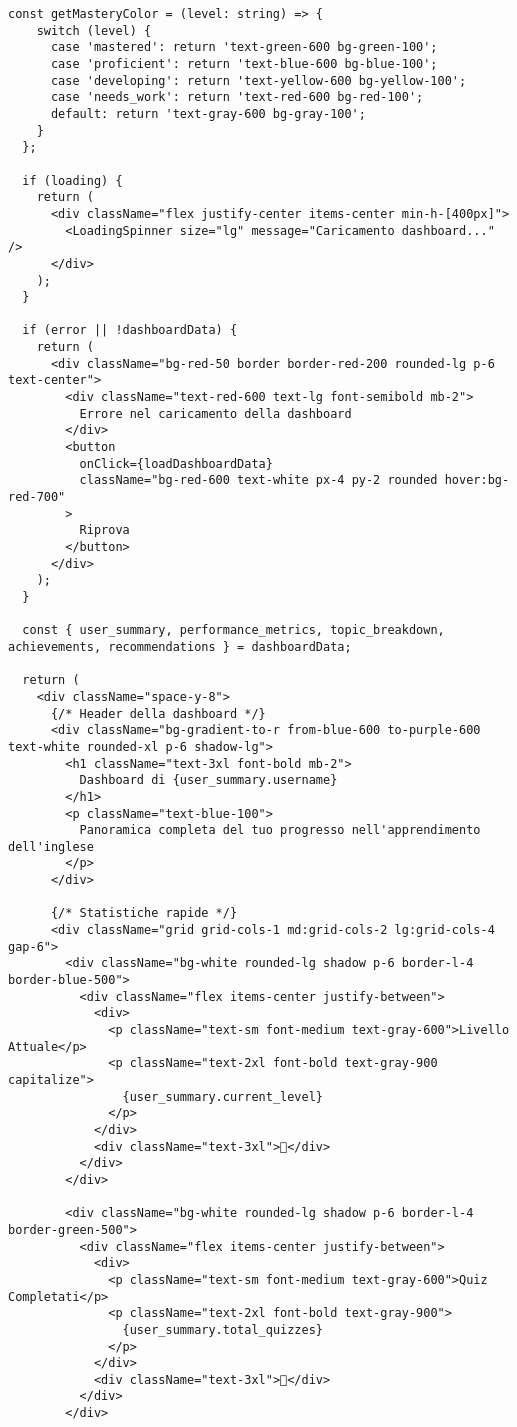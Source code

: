 \documentclass[a4paper, 14pt, oneside]{extbook}
\begin{document}
\begin{lstlisting}[style=javascriptstyle, caption=Dashboard Intelligente con Analytics Avanzate, label=lst:dashboard-component]
  const getMasteryColor = (level: string) => {
    switch (level) {
      case 'mastered': return 'text-green-600 bg-green-100';
      case 'proficient': return 'text-blue-600 bg-blue-100';
      case 'developing': return 'text-yellow-600 bg-yellow-100';
      case 'needs_work': return 'text-red-600 bg-red-100';
      default: return 'text-gray-600 bg-gray-100';
    }
  };

  if (loading) {
    return (
      <div className="flex justify-center items-center min-h-[400px]">
        <LoadingSpinner size="lg" message="Caricamento dashboard..." />
      </div>
    );
  }

  if (error || !dashboardData) {
    return (
      <div className="bg-red-50 border border-red-200 rounded-lg p-6 text-center">
        <div className="text-red-600 text-lg font-semibold mb-2">
          Errore nel caricamento della dashboard
        </div>
        <button 
          onClick={loadDashboardData}
          className="bg-red-600 text-white px-4 py-2 rounded hover:bg-red-700"
        >
          Riprova
        </button>
      </div>
    );
  }

  const { user_summary, performance_metrics, topic_breakdown, achievements, recommendations } = dashboardData;

  return (
    <div className="space-y-8">
      {/* Header della dashboard */}
      <div className="bg-gradient-to-r from-blue-600 to-purple-600 text-white rounded-xl p-6 shadow-lg">
        <h1 className="text-3xl font-bold mb-2">
          Dashboard di {user_summary.username}
        </h1>
        <p className="text-blue-100">
          Panoramica completa del tuo progresso nell'apprendimento dell'inglese
        </p>
      </div>

      {/* Statistiche rapide */}
      <div className="grid grid-cols-1 md:grid-cols-2 lg:grid-cols-4 gap-6">
        <div className="bg-white rounded-lg shadow p-6 border-l-4 border-blue-500">
          <div className="flex items-center justify-between">
            <div>
              <p className="text-sm font-medium text-gray-600">Livello Attuale</p>
              <p className="text-2xl font-bold text-gray-900 capitalize">
                {user_summary.current_level}
              </p>
            </div>
            <div className="text-3xl">🎯</div>
          </div>
        </div>

        <div className="bg-white rounded-lg shadow p-6 border-l-4 border-green-500">
          <div className="flex items-center justify-between">
            <div>
              <p className="text-sm font-medium text-gray-600">Quiz Completati</p>
              <p className="text-2xl font-bold text-gray-900">
                {user_summary.total_quizzes}
              </p>
            </div>
            <div className="text-3xl">📝</div>
          </div>
        </div>


\end{lstlisting}
\end{document}
